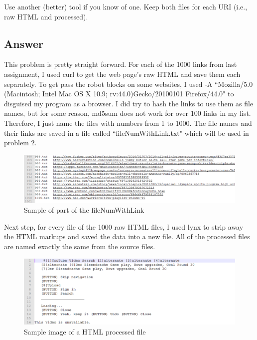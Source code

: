 \documentclass[12pt]{article}
\begin{document}
\noindent
Use another (better) tool if you know of one.  Keep both files 
for each URI (i.e., raw HTML and processed). 

\noindent


\subsection*{Answer}
This problem is pretty straight forward. For each of the 1000 links from last assignment, I used curl to get the web page's raw HTML and save them each separately. To get pass the robot blocks on some websites, I used -A ``Mozilla/5.0 (Macintosh; Intel Mac OS X 10.9; rv:44.0)Gecko/20100101 Firefox/44.0" to disguised my program as a browser. I did try to hash the links to use them as file names, but for some reason, md5sum does not work for over 100 links in my list. Therefore, I just name the files with numbers from 1 to 1000. The file names and their links are saved in a file called ``fileNumWithLink.txt" which will be used in problem 2.



\begin{figure}[h]
\centering
\includegraphics[width=6.5in]{fileNumWithLink.png}
\caption{Sample of part of the fileNumWithLink}
\end{figure}

Next step, for every file of the 1000 raw HTML files, I used lynx to strip away the HTML markups and saved the data into a new file. All of the processed files are named exactly the same from the source files. 


\newpage

\begin{figure}[h]
\centering
\includegraphics[width=6.5in]{38.png}
\caption{Sample image of a HTML processed file}
\end{figure}
\end{document}
